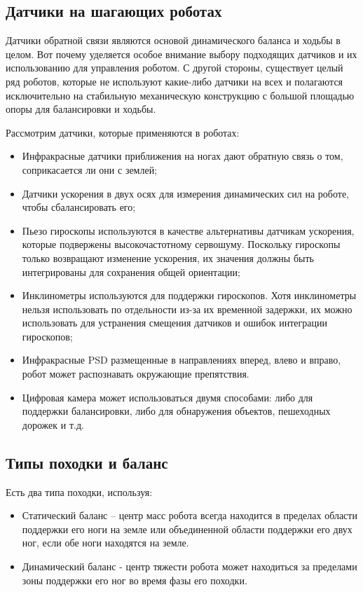 \subsection{Датчики на шагающих роботах}

Датчики обратной связи являются основой динамического баланса и ходьбы в целом. Вот почему уделяется особое внимание выбору подходящих датчиков и их использованию для управления роботом. С другой стороны, существует целый ряд роботов, которые не используют какие-либо датчики на всех и полагаются исключительно на стабильную механическую конструкцию с большой площадью опоры для балансировки и ходьбы.

Рассмотрим датчики, которые применяются в роботах:
\begin{itemize}
	\item Инфракрасные датчики приближения на ногах дают обратную связь о том, соприкасается ли они с землей;
	\item Датчики ускорения в двух осях для измерения динамических сил на роботе, чтобы сбалансировать его;
	\item Пьезо гироскопы используются в качестве альтернативы датчикам ускорения, которые подвержены высокочастотному сервошуму. Поскольку гироскопы только возвращают изменение ускорения, их значения должны быть интегрированы для сохранения общей ориентации;
	\item Инклинометры используются для поддержки гироскопов. Хотя инклинометры нельзя использовать по отдельности из-за их временной задержки, их можно использовать для устранения смещения датчиков и ошибок интеграции гироскопов;
	\item Инфракрасные PSD размещенные в направлениях вперед, влево и вправо, робот может распознавать окружающие препятствия.
	\item Цифровая камера может использоваться двумя способами: либо для поддержки балансировки, либо для обнаружения объектов, пешеходных дорожек и т.д.
\end{itemize}

\subsection{Типы походки и баланс}

Есть два типа походки, используя:

\begin{itemize}
	\item Статический баланс – центр масс робота всегда находится в пределах области поддержки его ноги на земле или объединенной области поддержки его двух ног, если обе ноги находятся на земле.
	\item Динамический баланс - центр тяжести робота может находиться за пределами зоны поддержки его ног во время фазы его походки.
\end{itemize}

